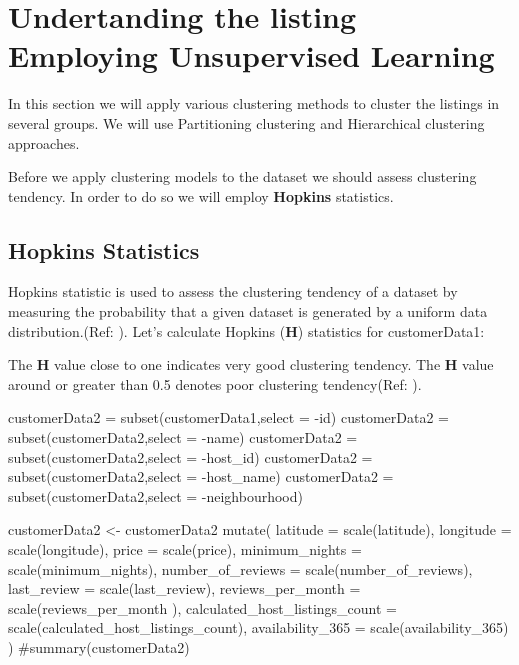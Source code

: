 \hypertarget{undertanding-the-listing-employing-unsupervised-learning}{%
\section{Undertanding the listing Employing Unsupervised
Learning}\label{undertanding-the-listing-employing-unsupervised-learning}}

In this section we will apply various clustering methods to cluster the
listings in several groups. We will use Partitioning clustering and
Hierarchical clustering approaches.

Before we apply clustering models to the dataset we should assess
clustering tendency. In order to do so we will employ \textbf{Hopkins}
statistics.

\hypertarget{hopkins-statistics}{%
\subsection{Hopkins Statistics}\label{hopkins-statistics}}

Hopkins statistic is used to assess the clustering tendency of a dataset
by measuring the probability that a given dataset is generated by a
uniform data distribution.(Ref: \cite{mining}). Let's calculate Hopkins
(\textbf{H}) statistics for customerData1:

The \textbf{H} value close to one indicates very good clustering
tendency. The \textbf{H} value around or greater than 0.5 denotes poor
clustering tendency(Ref: \cite{factoextra}).

\begin{Schunk}
\begin{Sinput}
customerData2 = subset(customerData1,select = -id)
customerData2 = subset(customerData2,select = -name)
customerData2 = subset(customerData2,select = -host_id)
customerData2 = subset(customerData2,select = -host_name)
customerData2 = subset(customerData2,select = -neighbourhood)

customerData2 <- customerData2 %>% 
mutate(
       latitude = scale(latitude),
       longitude = scale(longitude),
       price = scale(price),
       minimum_nights = scale(minimum_nights),
       number_of_reviews = scale(number_of_reviews),
       last_review = scale(last_review),
       reviews_per_month  = scale(reviews_per_month ),
       calculated_host_listings_count = scale(calculated_host_listings_count),
       availability_365 = scale(availability_365)
)
#summary(customerData2)
\end{Sinput}
\end{Schunk}

